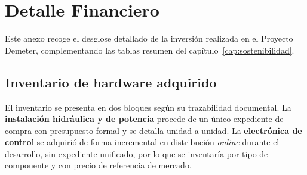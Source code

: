 \chapter{Detalle Financiero}
\label{anx:financiero}

Este anexo recoge el desglose detallado de la inversi\'on realizada en
el Proyecto Demeter, complementando las tablas resumen del
cap\'itulo~\ref{cap:sostenibilidad}.

\section{Inventario de hardware adquirido}
\label{sec:inventario}

El inventario se presenta en dos bloques seg\'un su trazabilidad
documental. La \textbf{instalaci\'on hidr\'aulica y de potencia} procede
de un \'unico expediente de compra con presupuesto formal y se detalla
unidad a unidad. La \textbf{electr\'onica de control} se adquiri\'o de
forma incremental en distribuci\'on \textit{online} durante el
desarrollo, sin expediente unificado, por lo que se inventar\'ia por
tipo de componente y con precio de referencia de mercado.

